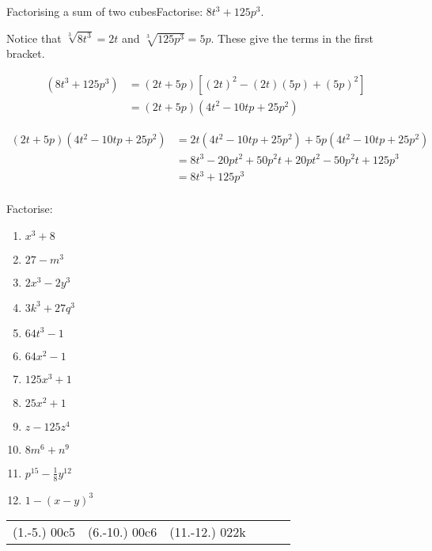 \begin{wex}{Factorising a sum of two cubes}{Factorise:  $8t^{3} +125p^{3}$.}
{

Notice that $\sqrt[3]{8t^{3}} = 2t$ and $\sqrt[3]{125p^{3}} = 5p$. These give the terms in the first bracket.

\begin{align*}
  (8t^{3} +125p^{3}) &= (2t + 5p)\left[(2t)^{2} - (2t)(5p)+(5p)^{2}\right] \\
                     &= (2t+5p)(4t^{2} - 10tp + 25p^{2})
\end{align*}

\begin{align*}
  (2t+5p)(4t^{2} - 10tp + 25p^{2}) &= 2t(4t^{2} - 10tp + 25p^{2})+5p(4t^{2} - 10tp + 25p^{2})\\
		   &= 8t^{3} - 20pt^{2} + 50p^{2}t+ 20pt^{2} - 50p^{2}t + 125p^{3}\\
		   &= 8t^{3} +125p^{3}\\
\end{align*}

}
\end{wex}


\begin{exercises}{}
{Factorise:
\begin{multicols}{2}
\begin{enumerate}[itemsep=5pt, label=\textbf{\arabic*}. ] 
\item ${x}^{3}+8$
\item $27-m^{3}$
\item $2x^{3}-2y^{3}$
\item $3k^{3} + 27q^{3}$
\item $64t^{3}-1$
\item $64x^{2} -1$
\item $125x^{3} +1$
\item $25x^{2} +1$
\item $z-125z^4{}$
\item $8m^{6} + n^{9}$
\item $p^{15} - \frac{1}{8}y^{12}$
\item $1- (x-y)^3$
\end{enumerate}
\end{multicols}
\practiceinfo 
\par 
 \par \begin{tabular}[h]{cccccc}
 (1.-5.) 00c5& (6.-10.) 00c6&  (11.-12.) 022k\end{tabular}
}
\end{exercises}

